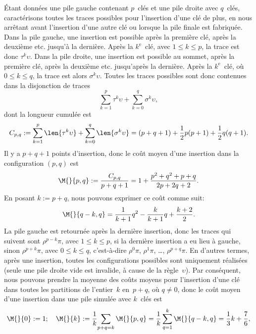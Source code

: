 Étant données une pile gauche contenant \(p\)~clés et une pile droite
avec \(q\)~clés, caractérisons toutes les traces possibles pour
l'insertion d'une clé de plus, en nous arrêtant avant l'insertion
d'une autre clé ou lorsque la pile finale est fabriquée. Dans la pile
gauche, une insertion est possible après la première clé, après la
deuxième etc. jusqu'à la dernière. Après la \(k^\text{e}\)~clé, avec
\(1 \leqslant k \leqslant p\), la trace est donc
\(\tau^k\upsilon\). Dans la pile droite, une insertion est possible au
sommet, après la première clé, après la deuxième etc. jusqu'après la
dernière. Après la \(k^\text{e}\)~clé, où \(0 \leqslant k \leqslant
q\), la trace est alors \(\sigma^k\upsilon\). Toutes les traces
possibles sont donc contenues dans la disjonction de traces
\begin{equation*}
\sum_{k=1}^{p}{\tau^k\upsilon} + \sum_{k=0}^{q}{\sigma^k\upsilon},
\end{equation*}
dont la longueur cumulée est
\begin{equation*}
C_{p,q} := \sum_{k=1}^{p}\len{\tau^k\upsilon} +
\sum_{k=0}^{q}\len{\sigma^k\upsilon}
= (p+q+1) + \frac{1}{2}p(p+1) + \frac{1}{2}q(q+1).
\end{equation*}
Il y a \(p+q+1\) points d'insertion, donc le coût moyen d'une
insertion dans la configuration \((p,q)\) est
\begin{equation}
\M{}{p,q} := \frac{C_{p,q}}{p+q+1}
           = 1 + \frac{p^2 + q^2 + p + q}{2p + 2q + 2}.
\label{eq_Mpq}
\end{equation}
En posant \(k := p + q\), nous pouvons exprimer ce coût comme suit:
\begin{equation*}
\M{}{q-k,q} = \frac{1}{k+1}{q^2} - \frac{k}{k+1}{q} + \frac{k+2}{2}.
\end{equation*}
La pile gauche est retournée après la dernière insertion, donc les
traces qui suivent sont \(\rho^{p-k}\pi\), avec \(1 \leqslant k
\leqslant p\), si la dernière insertion a eu lieu à gauche, sinon
\(\rho^{p+k}\pi\), avec \(0 \leqslant k \leqslant q\), c'est-à-dire
\(\rho^0\pi\), \(\rho^1\pi\), \ldots, \(\rho^{p+q}\pi\). En d'autres
termes, après une insertion, toutes les configurations possibles sont
uniquement réalisées (seule une pile droite vide est invalide, à cause
de la règle~\(\upsilon\)). Par conséquent, nous pouvons prendre la
moyenne des coûts moyens pour l'insertion d'une clé dans toutes les
partitions de l'entier~\(k\) en~\(p + q\), où \(q \neq 0\), donc le
coût moyen d'une insertion dans une pile simulée avec \(k\)~clés est
\begin{equation*}
\M{}{0} := 1;\quad
\M{}{k} := \frac{1}{k}\!\sum_{p+q=k}\M{}{p,q}
         = \frac{1}{k}\sum_{q=1}^{k}\M{}{q-k,q}
         = \frac{1}{3}k + \frac{7}{6},
\end{equation*}
